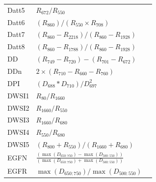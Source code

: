 \documentclass[remotesensing,article,submit,moreauthors,pdftex]{Definitions/mdpi}
\begin{document}
{\begin{supertabular}{lll}
		Datt5           & $R_{672}/R_{550}$                                                                                    & \cite{datt1998}               \\
		Datt6           & $(R_{860})/(R_{550}\times R_{708})$                                                                  & \cite{datt1998}               \\
		Datt7           & $(R_{860} - R_{2218})/(R_{860} - R_{1928})$                                                          & \cite{datt1999a}              \\
		Datt8           & $(R_{860} - R_{1788})/(R_{860} - R_{1928})$                                                          & \cite{datt1999a}              \\
		DD              & $(R_{749}-R_{720})-(R_{701}-R_{672})$                                                                & \cite{maire2004}              \\
		DDn             & $2\times (R_{710}-R_{660}-R_{760})$                                                                  & \cite{lemaire2008}            \\
		DPI             & $(D_{688}*D_{710})/D_{697}^2$                                                                        & \cite{zarco-tejada2003}      \\
		DWSI1           & $R_{80}/R_{1660}$                                                                                    & \cite{apan2004}               \\
		DWSI2           & $R_{1660}/R_{550}$                                                                                   & \cite{apan2004}               \\
		DWSI3           & $R_{1660}/R_{680}$                                                                                   & \cite{apan2004}               \\
		DWSI4           & $R_{550}/R_{680}$                                                                                    & \cite{apan2004}               \\
		DWSI5           & $(R_{800} + R_{550})/(R_{1660} + R_{680})$                                                           & \cite{apan2004}               \\
		EGFN            & $\frac{(\max(D_{650:750})-\max(D_{500:550}))}{(\max(D_{650:750})+\max(D_{500:550}))}$                & \cite{penuelas1994}           \\
		EGFR            & $\max(D_{650:750})/\max(D_{500:550})$                                                                & \cite{penuelas1994}           \\

\end{supertabular}}
\end{document}
